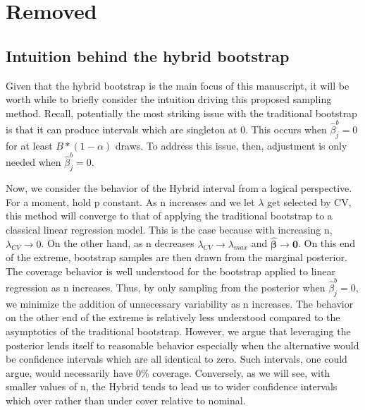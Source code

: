 

\section{Removed}

\subsection{Intuition behind the hybrid bootstrap}

Given that the hybrid bootstrap is the main focus of this manuscript, it will be worth while to briefly consider the intuition driving this proposed sampling method. Recall, potentially the most striking issue with the traditional bootstrap is that it can produce intervals which are singleton at 0. This occurs when $\hat{\beta}_j^b = 0$ for at least $B * (1 - \alpha)$ draws. To address this issue, then, adjustment is only needed when $\hat{\beta}_j^{b} = 0$. 

Now, we consider the behavior of the Hybrid interval from a logical perspective. For a moment, hold p constant. As n increases and we let $\lambda$ get selected by CV, this method will converge to that of applying the traditional bootstrap to a classical linear regression model. This is the case because with increasing n, $\lambda_{CV} \rightarrow 0$. On the other hand, as n decreases $\lambda_{CV} \rightarrow \lambda_{max}$ and $\hat{\boldsymbol{\beta}}\rightarrow \boldsymbol{0}$. On this end of the extreme, bootstrap samples are then drawn from the marginal posterior. The coverage behavior is well understood for the bootstrap applied to linear regression as n increases. Thus, by only sampling from the posterior when $\hat{\beta}_j^b = 0$, we minimize the addition of unnecessary variability as n increases. The behavior on the other end of the extreme is relatively less understood compared to the asymptotics of the traditional bootstrap. However, we argue that leveraging the posterior lends itself to reasonable behavior especially when the alternative would be confidence intervals which are all identical to zero. Such intervals, one could argue, would necessarily have 0\% coverage. Conversely, as we will see, with smaller values of n, the Hybrid tends to lead us to wider confidence intervals which over rather than under cover relative to nominal.

